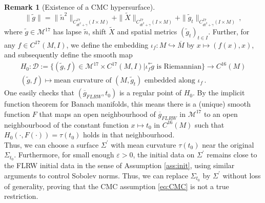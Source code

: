 \documentclass[11pt,leqno,textwidth=10cm]{amsart}
\numberwithin{equation}{section}
\theoremstyle{definition}
\newtheorem{remark}[definition]{Remark}
\theoremstyle{plain}
\newcommand{\1}{\mathbbm{1}}
\newcommand{\g}{\overline{g}}
\newcommand{\M}{\overline{M}}
\newcommand{\Ric}{\text{\normalfont{Ric}}}
\renewcommand{\epsilon}{\varepsilon}
\newcommand{\del}{\partial}
\newcommand{\Lap}{\Delta}
\begin{document}
\begin{remark}[Existence of a CMC hypersurface]
{\[\|\tilde{g}\|=\|\tilde{n}^2\|_{C^{17}_{dt^2+\gamma}(I\times M)}+\|\tilde{X}\|_{C^{17}_{dt^2+\gamma}(I\times M)}+\|\tilde{g}_t\|_{C^{17}_{dt^2+\gamma}(I\times M)}\,,\]
where $\tilde{g}\in\mathcal{M}^{17}$ has lapse $\tilde{n}$, shift $\tilde{X}$ and spatial metrics $(\tilde{g}_t)_{t\in I}$. Further, for any $f\in C^{17}(M,I)$, we define the embedding $\iota_f: M\hookrightarrow \M$ by $x\mapsto (f(x),x)$, and subsequently define the smooth map
\begin{gather*}
H_0:\mathcal{D}:=\{(\tilde{g},f)\in \mathcal{M}^{17}\times C^{17}(M,I)\vert \iota_f^\ast\tilde{g}\text{ is Riemannian}\}\longrightarrow C^{16}(M)\\
(\tilde{g},f)\mapsto \text{mean curvature of }(M,\tilde{g}_t)\text{ embedded along }\iota_f\,.
\end{gather*}
One easily checks that $(\g_{FLRW},t_0)$ is a regular point of $H_0$. By the implicit function theorem for Banach manifolds, this means there is a (unique) smooth function $F$ that maps an open neighbourhood of $\g_{FLRW}$ in $\mathcal{M}^{17}$ to an open neighbourbood of the constant function $x\mapsto t_0$ in $C^{16}(M)$ such that $H_0(\cdot,F(\cdot))=\tau(t_0)$ holds in that neighbourhood.\\
Thus, we can choose a surface $\Sigma^\prime$ with mean curvature $\tau(t_0)$ near the original $\Sigma_{t_0}$. Furthermore, for small enough $\epsilon>0$, the initial data on $\Sigma^\prime$ remains close to the FLRW initial data in the sense of Assumption \ref{ass:init}, using similar arguments to control Sobolev norms. Thus, we can replace $\Sigma_{t_0}$ by $\Sigma^\prime$ without loss of generality, proving that the CMC assumption \eqref{eq:CMC} is not a true restriction.}
\end{remark}
\end{document}
